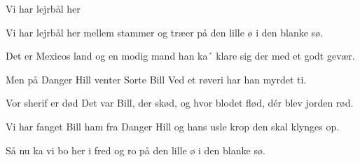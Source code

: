 \begin{sang}{Vi har lejrbål her}{}
\begin{vers}
Vi har lejrbål her
mellem stammer og træer
på den lille ø
i den blanke sø.
\end{vers}
\begin{vers}
Det er Mexicos land
og en modig mand
han ka´ klare sig der
med et godt gevær.
\end{vers}
\begin{vers}
Men på Danger Hill
venter Sorte Bill
Ved et røveri
har han myrdet ti.
\end{vers}
\begin{vers}
Vor sherif er død
Det var Bill, der skød,
og hvor blodet flød,
dér blev jorden rød.
\end{vers}
\begin{vers}
Vi har fanget Bill
ham fra Danger Hill
og hans usle krop
den skal klynges op.
\end{vers}
\begin{vers}
Så nu ka vi bo
her i fred og ro
på den lille ø
i den blanke sø.
\end{vers}
\end{sang}
